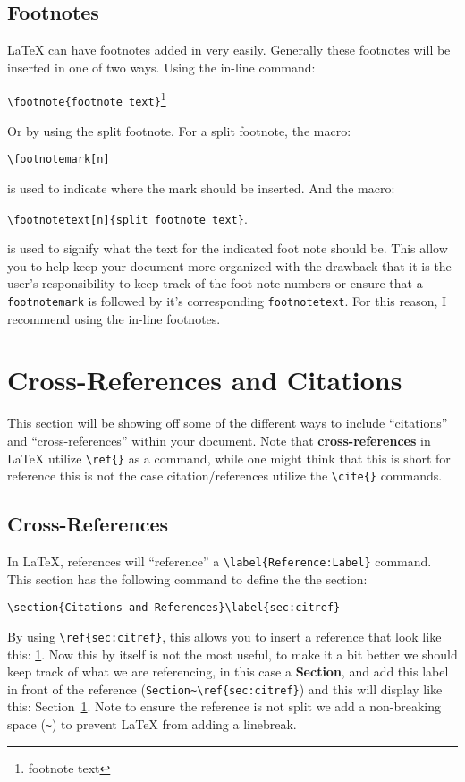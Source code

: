 		\subsection{Footnotes}
			\LaTeX{} can have footnotes added in very easily. 
			Generally these footnotes will be inserted in one of two ways.
			Using the in-line command:
			\begin{Center}
				\lstinline|\footnote{footnote text}|\footnote{footnote text} 
			\end{Center}
			Or by using the split footnote.
			For a split footnote, the macro:
			\begin{Center}
				\lstinline|\footnotemark[n]|\footnotemark{}
			\end{Center}
			is used to indicate where the mark should be inserted.
			And the macro: 
			\begin{Center}
				\lstinline|\footnotetext[n]{split footnote text}|.
			\end{Center}
			is used to signify what the text for the indicated foot note should be.
			This allow you to help keep your document more organized with the drawback that it is the user's responsibility to keep track of the foot note numbers or ensure that a \lstinline|footnotemark| is followed by it's corresponding \lstinline|footnotetext|.
			For this reason, I recommend using the in-line footnotes.
			\footnotetext{split footnote text}
		
	\section{Cross-References and Citations}\label{sec:citref}
		This section will be showing off some of the different ways to include \enquote{citations} and \enquote{cross-references} within your document.
		Note that \textbf{cross-references} in \LaTeX{} utilize \lstinline|\ref{}| as a command, while one might think that this is short for reference this is not the case citation/references utilize the \lstinline|\cite{}| commands.
		\subsection{Cross-References}\label{subsec:cross-reference}
			In \LaTeX{}, references will \enquote{reference} a \lstinline|\label{Reference:Label}| command. 
			This section has the following command to define the the section:
			\begin{Center}
				\lstinline|\section{Citations and References}\label{sec:citref}|
			\end{Center}
			By using \lstinline|\ref{sec:citref}|, this allows you to insert a reference that look like this: \ref{sec:citref}.
			Now this by itself is not the most useful, to make it a bit better we should keep track of what we are referencing, in this case a \textbf{Section}, and add this label in front of the reference (\lstinline|Section~\ref{sec:citref}|) and this will display like this: Section~\ref{sec:citref}.
			Note to ensure the reference is not split we add a non-breaking space (\lstinline|~|) to prevent \LaTeX{} from adding a linebreak.

